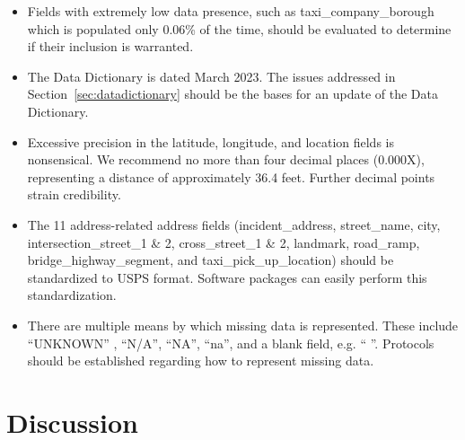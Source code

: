 \documentclass[linenumber]{jdsart}
\begin{document}
\begin{itemize}
	\item Fields with extremely low data presence, such as taxi\_company\_borough 
	which is populated only 0.06\% of the time, should be evaluated 
	to determine if their inclusion is warranted.
	
	\item The Data Dictionary is dated March 2023. The issues addressed 
	in Section~\ref{sec:datadictionary} should be the bases for an update of
	the Data Dictionary.
	
	\item Excessive precision in the latitude, longitude, and location 
	fields is nonsensical.  We recommend no more than 
	four decimal places (0.000X), representing a distance of approximately 
	36.4 feet. Further decimal points strain credibility.

	\item The 11 address-related address fields (incident\_address, 
	street\_name, city, intersection\_street\_1 \& 2, cross\_street\_1 \& 2,  
	landmark, road\_ramp, bridge\_highway\_segment, and 
	taxi\_pick\_up\_location) should be standardized to USPS format. 
	Software packages can easily perform this standardization. 
	
	\item There are multiple means by which missing data is 
	represented. These include ``UNKNOWN'' , ``N/A'', ``NA'', ``na'', and 
	a blank field, e.g. `` ''. Protocols should be established regarding 
	how to represent missing data.
\end{itemize}


\section{Discussion} \label{sec:discussion}



\end{document}
